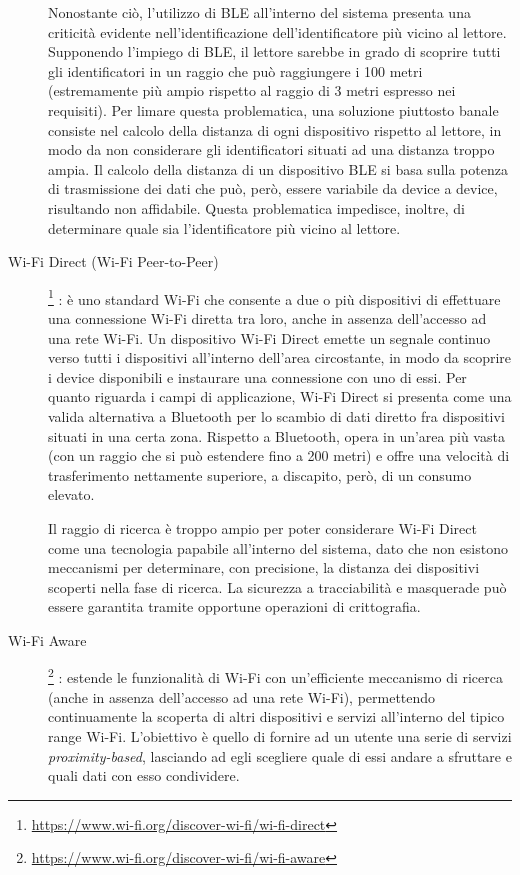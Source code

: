 \documentclass[a4paper,12pt]{report}
\begin{document}
\begin{description}
	Nonostante ciò, l'utilizzo di BLE all'interno del sistema presenta una criticità evidente nell'identificazione dell'identificatore più vicino al lettore. Supponendo l'impiego di BLE, il lettore sarebbe in grado di scoprire tutti gli identificatori in un raggio che può raggiungere i 100 metri (estremamente più ampio rispetto al raggio di 3 metri espresso nei requisiti). Per limare questa problematica, una soluzione piuttosto banale consiste nel calcolo della distanza di ogni dispositivo rispetto al lettore, in modo da non considerare gli identificatori situati ad una distanza troppo ampia. Il calcolo della distanza di un dispositivo BLE si basa sulla potenza di trasmissione dei dati che può, però, essere variabile da device a device, risultando non affidabile. Questa problematica impedisce, inoltre, di determinare quale sia l'identificatore più vicino al lettore.
	
	\item[Wi-Fi Direct (Wi-Fi Peer-to-Peer)]\footnote{\url{https://www.wi-fi.org/discover-wi-fi/wi-fi-direct}} : è uno standard Wi-Fi che consente a due o più dispositivi di effettuare una connessione Wi-Fi diretta tra loro, anche in assenza dell'accesso ad una rete Wi-Fi. Un dispositivo Wi-Fi Direct emette un segnale continuo verso tutti i dispositivi all'interno dell'area circostante, in modo da scoprire i device disponibili e instaurare una connessione con uno di essi. Per quanto riguarda i campi di applicazione, Wi-Fi Direct si presenta come una valida alternativa a Bluetooth per lo scambio di dati diretto fra dispositivi situati in una certa zona. Rispetto a Bluetooth, opera in un'area più vasta (con un raggio che si può estendere fino a 200 metri) e offre una velocità di trasferimento nettamente superiore, a discapito, però, di un consumo elevato. 
	
	Il raggio di ricerca è troppo ampio per poter considerare Wi-Fi Direct come una tecnologia papabile all'interno del sistema, dato che non esistono meccanismi per determinare, con precisione, la distanza dei dispositivi scoperti nella fase di ricerca. La sicurezza a tracciabilità e masquerade può essere garantita tramite opportune operazioni di crittografia.
	
	\item[Wi-Fi Aware]\footnote{\url{https://www.wi-fi.org/discover-wi-fi/wi-fi-aware}} : estende le funzionalità di Wi-Fi con un'efficiente meccanismo di ricerca (anche in assenza dell'accesso ad una rete Wi-Fi), permettendo continuamente la scoperta di altri dispositivi e servizi all'interno del tipico range Wi-Fi. L'obiettivo è quello di fornire ad un utente una serie di servizi \emph{proximity-based}, lasciando ad egli scegliere quale di essi andare a sfruttare e quali dati con esso condividere. 
	

\end{description}
\end{document}
